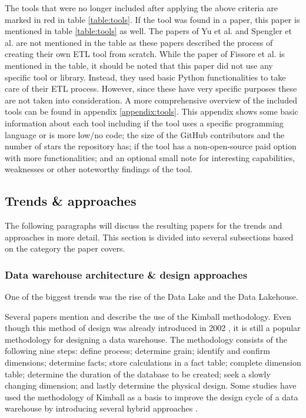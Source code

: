 \documentclass[11pt]{article}
\begin{document}
The tools that were no longer included after applying the above criteria are marked in red in table \ref{table:tools}. If the tool was found in a paper, this paper is mentioned in table \ref{table:tools} as well. The papers of Yu et al. and Spengler et al. \cite{Yu2022, Spengler2020415} are not mentioned in the table as these papers described the process of creating their own ETL tool from scratch. While the paper of Fissore et al. is mentioned in the table, it should be noted that this paper did not use any specific tool or library. Instead, they used basic Python functionalities to take care of their ETL process. However, since these have very specific purposes these are not taken into consideration. A more comprehensive overview of the included tools can be found in appendix \ref{appendix:tools}. This appendix shows some basic information about each tool including if the tool uses a specific programming language or is more low/no code; the size of the GitHub contributors and the number of stars the repository has; if the tool has a non-open-source paid option with more functionalities; and an optional small note for interesting capabilities, weaknesses or other noteworthy findings of the tool. \\ 


\subsection{Trends \& approaches}
\label{results:trends}
The following paragraphs will discuss the resulting papers for the trends and approaches in more detail. This section is divided into several subsections based on the category the paper covers.

\subsubsection{Data warehouse architecture \& design approaches}
\label{results:trends:design}
One of the biggest trends was the rise of the Data Lake and the Data Lakehouse. 

Several papers \cite{Ramadhani202188, Himami2021146, Wahyudi2019, Rahutomo2018128} mention and describe the use of the Kimball methodology. Even though this method of design was already introduced in 2002 \cite{kimball2011data}, it is still a popular methodology for designing a data warehouse. The methodology consists of the following nine steps: define process; determine grain; identify and confirm dimensions; determine facts; store calculations in a fact table; complete dimension table; determine the duration of the database to be created; seek a slowly changing dimension; and lastly determine the physical design. Some studies have used the methodology of Kimball as a basis to improve the design cycle of a data warehouse by introducing several hybrid approaches \cite{Takács20201}. \\
\end{document}
